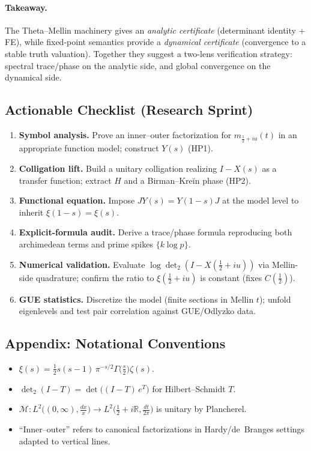 \paragraph{Takeaway.}
The Theta–Mellin machinery gives an \emph{analytic certificate} (determinant identity + FE),
while fixed-point semantics provide a \emph{dynamical certificate} (convergence to a stable truth valuation).
Together they suggest a two-lens verification strategy: spectral trace/phase on the analytic side, and global convergence on the dynamical side.

\subsection{Actionable Checklist (Research Sprint)}

\begin{enumerate}
  \item \textbf{Symbol analysis.} Prove an inner–outer factorization for \(m_{\frac12+iu}(t)\) in an appropriate function model; construct \(Y(s)\) (HP1).
  \item \textbf{Colligation lift.} Build a unitary colligation realizing \(I-X(s)\) as a transfer function; extract \(H\) and a Birman–Kreĭn phase (HP2).
  \item \textbf{Functional equation.} Impose \(JY(s)=Y(1-s)J\) at the model level to inherit \(\xi(1-s)=\xi(s)\).
  \item \textbf{Explicit-formula audit.} Derive a trace/phase formula reproducing both archimedean terms and prime spikes \(\{k\log p\}\).
  \item \textbf{Numerical validation.} Evaluate \(\log\det_{2}(I-X(\tfrac12+iu))\) via Mellin-side quadrature; confirm the ratio to \(\xi(\tfrac12+iu)\) is constant (fixes \(C(\tfrac12)\)).
  \item \textbf{GUE statistics.} Discretize the model (finite sections in Mellin \(t\)); unfold eigenlevels and test pair correlation against GUE/Odlyzko data.
\end{enumerate}

\subsection{Appendix: Notational Conventions}

\begin{itemize}
  \item \(\displaystyle \xi(s)=\tfrac12 s(s-1)\,\pi^{-s/2}\Gamma\!\big(\tfrac{s}{2}\big)\zeta(s)\).
  \item \(\det_{2}(I-T)=\det\!\big((I-T)\,e^{T}\big)\) for Hilbert–Schmidt \(T\).
  \item \(\mathcal{M}:L^2\!\big((0,\infty),\tfrac{dx}{x}\big)\to L^2\!\big(\tfrac12+i\mathbb{R},\tfrac{dt}{2\pi}\big)\) is unitary by Plancherel.
  \item ``Inner–outer'' refers to canonical factorizations in Hardy/de~Branges settings adapted to vertical lines.
\end{itemize}



